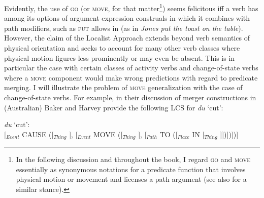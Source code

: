 Evidently, the use of \textsc{go} (or \textsc{move}, for that matter\footnote{In the following discussion and throughout the book, I regard \textsc{go} and \textsc{move} essentially as synonymous notations for a predicate function that involves physical motion or movement and licenses a path argument (see also \citealt[27]{baker2010complex} for a similar stance).}) seems felicitous iff a verb has among its options of argument expression construals in which it combines with path modifiers, such as \textsc{put} allows in  (as in \textit{Jones put the toast on the table}). However, the claim of the Localist Approach extends beyond verb semantics of physical orientation and seeks to account for many other verb classes where physical motion figures less prominently or may even be absent. This is in particular the case with certain classes of activity verbs and change-of-state verbs where a \textsc{move} component would make wrong predictions with regard to predicate merging. I will illustrate the problem of \textsc{move} generalization with the case of change-of-state verbs. For example, in their discussion of merger constructions in  (Australian) Baker and Harvey provide the following LCS for \textit{du} `cut':

\ea \label{Wagiman01}
\textit{du} `cut': \\
{\small[$_{Event}$ CAUSE ([$_{Thing}$ ], [$_{Event}$ MOVE ([$_{Thing}$ ], 
[$_{Path}$ TO ([$_{Place}$ IN [$_{Thing}$ ]])])])]}
\z

